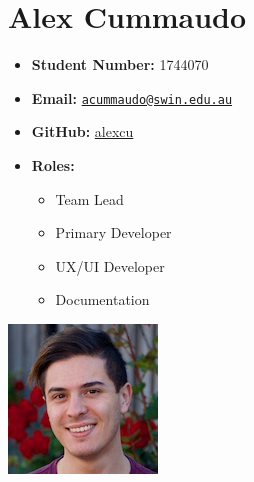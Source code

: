 \documentclass[a4paper,12pt]{article}
\date{}
\providecommand{\tightlist}{%
  \setlength{\itemsep}{0pt}\setlength{\parskip}{0pt}}
\begin{document}
{
\setcounter{tocdepth}{3}
\tableofcontents
}
\newpage

\begin{minipage}{0.7\textwidth}
\section{Alex Cummaudo}\label{alex-cummaudo}
\begin{itemize}[label={}]
\tightlist
\item
  \textbf{Student Number:} 1744070
\item
  \textbf{Email:}
  \href{mailto:acummaudo@swin.edu.au}{\nolinkurl{acummaudo@swin.edu.au}}
\item
  \textbf{GitHub:} \href{http://www.github.com/alexcu}{alexcu}
\item
  \textbf{Roles:}
  \begin{itemize}
    \item Team Lead
    \item Primary Developer
    \item UX/UI Developer
    \item Documentation
  \end{itemize}
\end{itemize}
\end{minipage}%
\begin{minipage}{0.3\textwidth}
\includegraphics{./imgs/alex.jpeg}
\end{minipage}

\vspace{3em}
\end{document}

